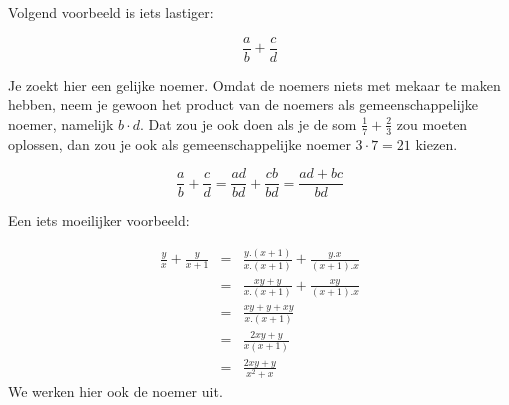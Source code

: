 	\begin{voorbeeld}
			Volgend voorbeeld is iets lastiger:
		
		\begin{equation*}
			{\displaystyle \frac{a}{b}+\frac{c}{d}}
		\end{equation*}
	
			Je zoekt hier een gelijke noemer. Omdat de noemers niets
		met mekaar te maken hebben, neem je gewoon het product van de noemers
		als gemeenschappelijke noemer, namelijk $b\cdot d$. Dat zou je ook
		doen als je de som $\frac{1}{7}+\frac{2}{3}$ zou moeten oplossen,
		dan zou je ook als gemeenschappelijke noemer $3\cdot7=21$ kiezen.
		
		\begin{equation*}
		{\displaystyle \frac{a}{b}+\frac{c}{d}=\frac{ad}{bd}+\frac{cb}{bd}=\frac{ad+bc}{bd}}
		\end{equation*}
	\end{voorbeeld}	
		
	\begin{voorbeeld}
		Een iets moeilijker voorbeeld:
	
	\begin{eqnarray*}
		{\displaystyle \frac{y}{x}+\frac{y}{x+1}} & = & {\displaystyle \frac{y.(x+1)}{x.(x+1)}+\frac{y.x}{(x+1).x}} \\
		& = & {\displaystyle \frac{xy+y}{x.(x+1)}+\frac{xy}{(x+1).x}} \\
		& = & {\displaystyle \frac{xy+y+xy}{x.(x+1)}} \\
		& = & {\displaystyle \frac{2xy+y}{x(x+1)}} \\
		& = & {\displaystyle \frac{2xy+y}{x^{2}+x}} 
	\end{eqnarray*}
	We werken hier ook de noemer uit.
	
	\end{voorbeeld}
	
